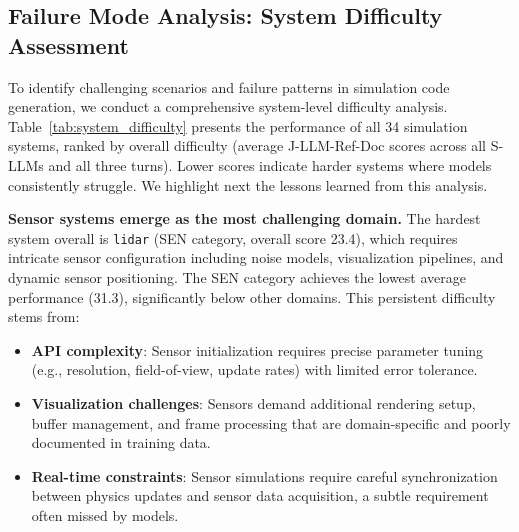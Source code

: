 \documentclass{ieeeaccess}
\begin{document}



\subsection{Failure Mode Analysis: System Difficulty Assessment}
\label{subsec:failure_mode}
To identify challenging scenarios and failure patterns in simulation code generation, we conduct a comprehensive system-level difficulty analysis. Table~\ref{tab:system_difficulty} presents the performance of all 34 simulation systems, ranked by overall difficulty (average J-LLM-Ref-Doc scores across all S-LLMs and all three turns). Lower scores indicate harder systems where models consistently struggle. We highlight next the lessons learned from this analysis.

\textbf{Sensor systems emerge as the most challenging domain.}
The hardest system overall is \texttt{lidar} (SEN category, overall score 23.4), which requires intricate sensor configuration including noise models, visualization pipelines, and dynamic sensor positioning. The SEN category achieves the lowest average performance (31.3), significantly below other domains. This persistent difficulty stems from:

\begin{itemize}
    \item \textbf{API complexity}: Sensor initialization requires precise parameter tuning (e.g., resolution, field-of-view, update rates) with limited error tolerance.
    \item \textbf{Visualization challenges}: Sensors demand additional rendering setup, buffer management, and frame processing that are domain-specific and poorly documented in training data.
    \item \textbf{Real-time constraints}: Sensor simulations require careful synchronization between physics updates and sensor data acquisition, a subtle requirement often missed by models.
\end{itemize}
\end{document}
